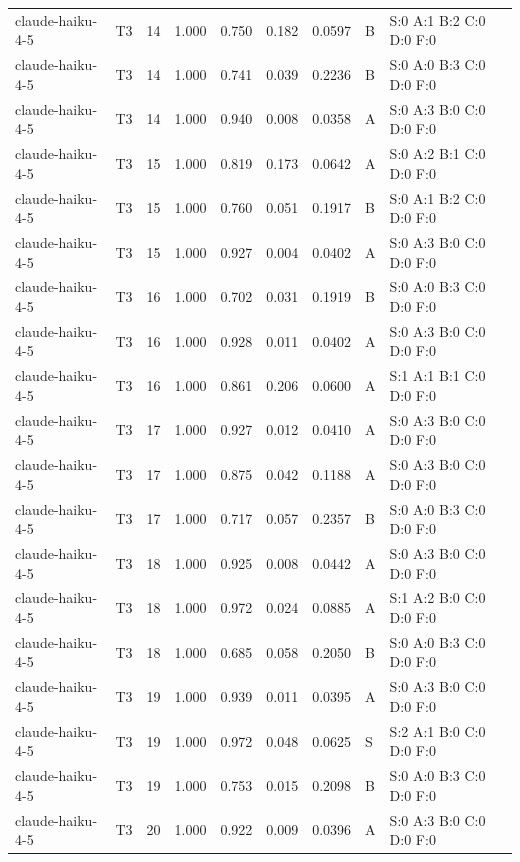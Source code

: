 \begin{longtable}{llrrrrrll}
claude-haiku-4-5 & T3 & 14 & 1.000 & 0.750 & 0.182 & 0.0597 & B & \tiny S:0 A:1 B:2 C:0 D:0 F:0 \\
claude-haiku-4-5 & T3 & 14 & 1.000 & 0.741 & 0.039 & 0.2236 & B & \tiny S:0 A:0 B:3 C:0 D:0 F:0 \\
claude-haiku-4-5 & T3 & 14 & 1.000 & 0.940 & 0.008 & 0.0358 & A & \tiny S:0 A:3 B:0 C:0 D:0 F:0 \\
claude-haiku-4-5 & T3 & 15 & 1.000 & 0.819 & 0.173 & 0.0642 & A & \tiny S:0 A:2 B:1 C:0 D:0 F:0 \\
claude-haiku-4-5 & T3 & 15 & 1.000 & 0.760 & 0.051 & 0.1917 & B & \tiny S:0 A:1 B:2 C:0 D:0 F:0 \\
claude-haiku-4-5 & T3 & 15 & 1.000 & 0.927 & 0.004 & 0.0402 & A & \tiny S:0 A:3 B:0 C:0 D:0 F:0 \\
claude-haiku-4-5 & T3 & 16 & 1.000 & 0.702 & 0.031 & 0.1919 & B & \tiny S:0 A:0 B:3 C:0 D:0 F:0 \\
claude-haiku-4-5 & T3 & 16 & 1.000 & 0.928 & 0.011 & 0.0402 & A & \tiny S:0 A:3 B:0 C:0 D:0 F:0 \\
claude-haiku-4-5 & T3 & 16 & 1.000 & 0.861 & 0.206 & 0.0600 & A & \tiny S:1 A:1 B:1 C:0 D:0 F:0 \\
claude-haiku-4-5 & T3 & 17 & 1.000 & 0.927 & 0.012 & 0.0410 & A & \tiny S:0 A:3 B:0 C:0 D:0 F:0 \\
claude-haiku-4-5 & T3 & 17 & 1.000 & 0.875 & 0.042 & 0.1188 & A & \tiny S:0 A:3 B:0 C:0 D:0 F:0 \\
claude-haiku-4-5 & T3 & 17 & 1.000 & 0.717 & 0.057 & 0.2357 & B & \tiny S:0 A:0 B:3 C:0 D:0 F:0 \\
claude-haiku-4-5 & T3 & 18 & 1.000 & 0.925 & 0.008 & 0.0442 & A & \tiny S:0 A:3 B:0 C:0 D:0 F:0 \\
claude-haiku-4-5 & T3 & 18 & 1.000 & 0.972 & 0.024 & 0.0885 & A & \tiny S:1 A:2 B:0 C:0 D:0 F:0 \\
claude-haiku-4-5 & T3 & 18 & 1.000 & 0.685 & 0.058 & 0.2050 & B & \tiny S:0 A:0 B:3 C:0 D:0 F:0 \\
claude-haiku-4-5 & T3 & 19 & 1.000 & 0.939 & 0.011 & 0.0395 & A & \tiny S:0 A:3 B:0 C:0 D:0 F:0 \\
claude-haiku-4-5 & T3 & 19 & 1.000 & 0.972 & 0.048 & 0.0625 & S & \tiny S:2 A:1 B:0 C:0 D:0 F:0 \\
claude-haiku-4-5 & T3 & 19 & 1.000 & 0.753 & 0.015 & 0.2098 & B & \tiny S:0 A:0 B:3 C:0 D:0 F:0 \\
claude-haiku-4-5 & T3 & 20 & 1.000 & 0.922 & 0.009 & 0.0396 & A & \tiny S:0 A:3 B:0 C:0 D:0 F:0 \\

\end{longtable}
